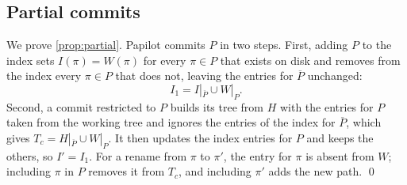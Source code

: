 \subsection{Partial commits}

We prove \cref{prop:partial}. Papilot commits $P$ in two steps. First, adding $P$ to the index sets
$I(\pi) = W(\pi)$ for every $\pi \in P$ that exists on disk and removes from the
index every $\pi \in P$ that does not, leaving the entries for $\overline{P}$
unchanged:
\begin{equation}
  I_1 = I|_{\overline{P}} \cup W|_{P} .
\end{equation}
Second, a commit restricted to $P$ builds its tree from $H$ with the entries
for $P$ taken from the working tree and ignores the entries of the index for
$\overline{P}$, which gives $T_c = H|_{\overline{P}} \cup W|_{P}$. It then
updates the index entries for $P$ and keeps the others, so $I' = I_1$. For a
rename from $\pi$ to $\pi'$, the entry for $\pi$ is absent from $W$; including
$\pi$ in $P$ removes it from $T_c$, and including $\pi'$ adds the new path. \qed
